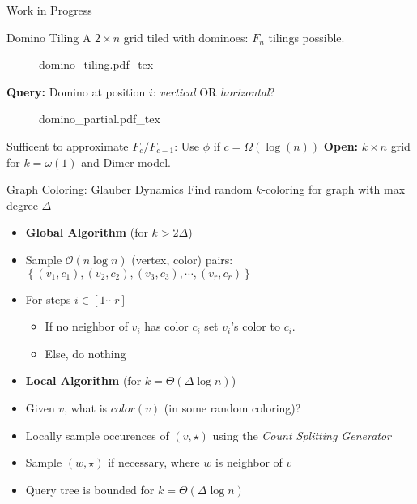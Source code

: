 \begin{block}{Work in Progress}



\begin{alertblock}{Domino Tiling}
A $2\times n$ grid tiled with dominoes: $F_n$ tilings possible.
\begin{figure}[h!]\centering
    \def\svgwidth{0.8\columnwidth}
    {domino_tiling.pdf_tex}
\end{figure}
\textbf{Query:} Domino at position $i$: \emph{vertical} OR \emph{horizontal}?
\begin{figure}[h!]\centering
    \def\svgwidth{0.8\columnwidth}
    {domino_partial.pdf_tex}
\end{figure}
Sufficent to approximate $F_c/F_{c-1}$: Use $\phi$ if $c = \Omega(\log(n))$
\textbf{Open:} $k\times n$ grid for $k = \omega(1)$ and Dimer model.
\end{alertblock}


\begin{alertblock}{Graph Coloring: Glauber Dynamics}
Find random $k$-coloring for graph with max degree $\Delta$
\begin{itemize}
    \item [] \textbf{Global Algorithm} (for $k > 2\Delta$)
    \item Sample $\mathcal O(n\log n)$ (vertex, color) pairs:
          $\left\{ (v_1, c_1), (v_2, c_2), (v_3, c_3), \cdots, (v_r, c_r)\right\}$
    \item For steps $i\in [1\cdots r]$
    \begin{itemize}
        \item If no neighbor of $v_i$  has color $c_i$ set $v_i$'s color to $c_i$.
        \item Else, do nothing
    \end{itemize}
\end{itemize}
\begin{itemize}
    \item [] \textbf{Local Algorithm} (for $k = \Theta(\Delta\log n)$)
    \item Given $v$, what is $color(v)$ (in some random coloring)?
    \item Locally sample occurences of $(v, \star)$ using the \emph{Count Splitting Generator}
    \item Sample $(w, \star)$ if necessary, where $w$ is neighbor of $v$
    \item Query tree is bounded for $k = \Theta(\Delta\log n)$
\end{itemize}
\end{alertblock}




\end{block}
